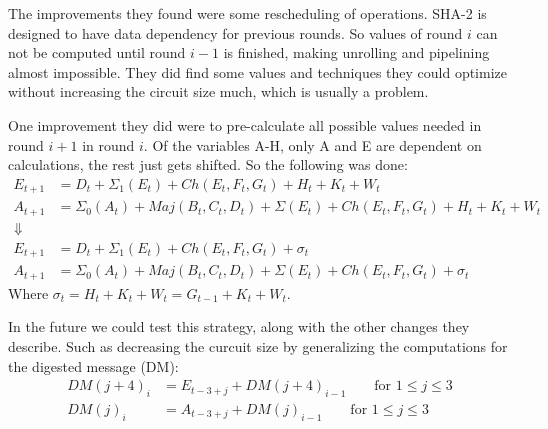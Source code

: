 \documentclass[a4paper, openany]{memoir}
\begin{document}
\begin{abstact}
The improvements they found were some rescheduling of operations. SHA-2 is designed to have data dependency for previous rounds.
So values of round \(i\) can not be computed until round \(i-1\) is finished, making unrolling and pipelining almost impossible.
They did find some values and techniques they could optimize without increasing the circuit size much, which is usually a problem.

One improvement they did were to pre-calculate all possible values needed in round \(i+1\) in round \(i\).
Of the variables A-H, only A and E are dependent on calculations, the rest just gets shifted. So the following was done:
\begin{align}
E_{t+1} &= D_t+\Sigma_1(E_t)+Ch(E_t,F_t,G_t)+H_t+K_t+W_t\\
A_{t+1} &= \Sigma_0(A_t)+Maj(B_t,C_t,D_t)+\Sigma(E_t)+Ch(E_t,F_t,G_t)+H_t+K_t+W_t\\
\Downarrow\\
E_{t+1} &= D_t+\Sigma_1(E_t)+Ch(E_t,F_t,G_t)+\sigma_t\\
A_{t+1} &= \Sigma_0(A_t)+Maj(B_t,C_t,D_t)+\Sigma(E_t)+Ch(E_t,F_t,G_t)+\sigma_t
\end{align}
Where \(\sigma_t = H_t + K_t + W_t = G_{t-1} + K_t + W_t\).

In the future we could test this strategy, along with the other changes they describe. Such as decreasing the curcuit size by generalizing the computations for the digested message (DM):
\begin{align}
DM(j+4)_i &= E_{t-3+j} + DM(j+4)_{i-1}\qquad \text{for } 1\leq j \leq 3\\
DM(j)_i &= A_{t-3+j} + DM(j)_{i-1}\qquad \text{for } 1\leq j \leq 3
\end{align}


\end{abstact}
\end{document}
